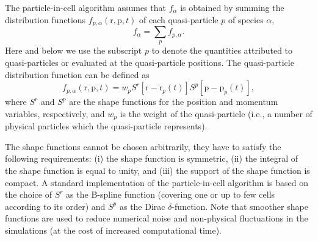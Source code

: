 \documentclass[10pt, a4paper, twoside, openright]{report}
\renewcommand{\vec}[1]{\boldsymbol{\mathrm{#1}}}
\begin{document}
The particle-in-cell algorithm assumes that $ f_{\alpha} $ is obtained by summing the distribution functions $ f_{p, \alpha} \left( \vec{r}, \vec{p}, t \right) $ of each quasi-particle $ p $ of species $ \alpha $,
\begin{equation}\label{eq:dist_function}
	f_{\alpha} =  \sum_{p} f_{p, \alpha}.
\end{equation}
Here and below we use the subscript $ p $ to denote the quantities attributed to quasi-particles or evaluated at the quasi-particle positions. The quasi-particle distribution function can be defined as 
\begin{equation}\label{eq:quasi_particle_dist_function}
	f_{p, \alpha} \left( \vec{r}, \vec{p}, t \right) = w_{p} S^r \left[ \vec{r} - \vec{r}_{p} \left( t \right) \right] S^p \left[ \vec{p} - \vec{p}_{p} \left( t \right) \right],
\end{equation}
where $ S^r $ and $ S^p $ are the shape functions for the position and momentum variables, respectively, and $ w_{p} $ is the weight of the quasi-particle (i.e., a number of physical particles which the quasi-particle represents).

The shape functions cannot be chosen arbitrarily, they have to satisfy the following requirements: (i) the shape function is symmetric, (ii) the integral of the shape function is equal to unity, and (iii) the support of the shape function is compact. A standard implementation of the particle-in-cell algorithm is based on the choice of $ S^r $ as the B-spline function (covering one or up to few cells according to its order) and $ S^p $ as the Dirac $ \delta $-function. Note that smoother shape functions are used to reduce numerical noise and non-physical fluctuations in the simulations (at the cost of increased computational time).
\end{document}
